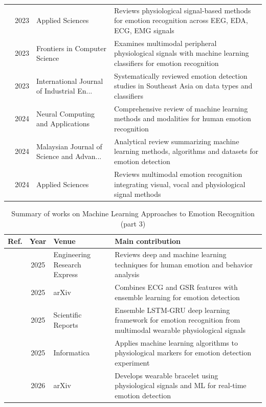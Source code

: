 \begin{table}[!t]
\begin{tabularx}{\textwidth}{@{}l c p{3.6cm} X@{}}
\cite{lin2023review} & 2023 & Applied Sciences & Reviews physiological signal-based methods for emotion recognition across EEG, EDA, ECG, EMG signals \\
\cite{gohumpu2023emotion} & 2023 & Frontiers in Computer Science & Examines multimodal peripheral physiological signals with machine learning classifiers for emotion recognition \\
\cite{destyanto2023emotion} & 2023 & International Journal of Industrial En... & Systematically reviewed emotion detection studies in Southeast Asia on data types and classifiers \\
\cite{younis2024machine} & 2024 & Neural Computing and Applications & Comprehensive review of machine learning methods and modalities for human emotion recognition \\
\cite{shawon2024emotion} & 2024 & Malaysian Journal of Science and Advan... & Analytical review summarizing machine learning methods, algorithms and datasets for emotion detection \\
\cite{udahemuka2024multimodal} & 2024 & Applied Sciences & Reviews multimodal emotion recognition integrating visual, vocal and physiological signal methods \\
\bottomrule
\end{tabularx}
\end{table}

\begin{table}[!t]
\centering
\renewcommand{\arraystretch}{1.2}
\caption{Summary of works on Machine Learning Approaches to Emotion Recognition (part 3)}
\begin{tabularx}{\textwidth}{@{}l c p{3.6cm} X@{}}
\toprule
\textbf{Ref.} & \textbf{Year} & \textbf{Venue} & \textbf{Main contribution} \\
\midrule
\cite{jinnuo2025analysis} & 2025 & Engineering Research Express & Reviews deep and machine learning techniques for human emotion and behavior analysis \\
\cite{subasi2025multimodal} & 2025 & arXiv & Combines ECG and GSR features with ensemble learning for emotion detection \\
\cite{nandini2025ensemble} & 2025 & Scientific Reports & Ensemble LSTM-GRU deep learning framework for emotion recognition from multimodal wearable physiological signals \\
\cite{kocaleva2025emotion} & 2025 & Informatica & Applies machine learning algorithms to physiological markers for emotion detection experiment \\
\cite{sharef2026development} & 2026 & arXiv & Develops wearable bracelet using physiological signals and ML for real-time emotion detection \\
\bottomrule
\end{tabularx}
\end{table}

